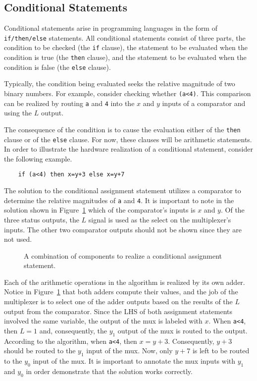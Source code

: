 \subsection{Conditional Statements}
Conditional statements arise in programming languages in the
form of \verb+if/then/else+ statements.  All conditional statements consist
of three parts, the condition to be checked (the \verb+if+ clause), the
statement to be evaluated when the condition is true (the \verb+then+ clause),
and the statement to be evaluated when the condition is false (the
\verb+else+ clause).

Typically, the condition being evaluated seeks the relative
magnitude of two binary numbers.  For example, consider checking whether
\verb+(a<4)+.  This comparison can be
realized by routing \verb+a+ and \verb+4+ into the $x$ and
$y$ inputs of a comparator and using the $L$ output.

The consequence of the condition is to cause the evaluation either of
the \verb+then+ clause or of the \verb+else+ clause.  For now, these
clauses will
be arithmetic statements.  In order to illustrate the hardware
realization of a conditional statement, consider the following
example.

\begin{verbatim}
    if (a<4) then x=y+3 else x=y+7
\end{verbatim}

The solution to the conditional assignment statement utilizes
a comparator to determine the relative magnitudes of \verb+a+
and \verb+4+.  It is important to note in the solution shown in
Figure~\ref{fig:comboBBcond} which of the
comparator's inputs is $x$ and $y$.  Of the three status outputs,
the $L$ signal is used as the select on the multiplexer's inputs.  The
other two comparator outputs should not be shown since they are
not used.

\begin{figure}[ht]
    \caption{A combination of components to realize a conditional assignment
    statement.}
    \label{fig:comboBBcond}
\end{figure}

Each of the arithmetic operations in the algorithm is realized
by its own adder. Notice in Figure~\ref{fig:comboBBcond} that both
adders compute their values, and the job of the multiplexer is to
select one of the adder outputs based on the results of the $L$ output
from the comparator.    Since the LHS of both assignment statements
involved the same variable, the output of the mux is labeled with
$x$.  When \verb+a<4+, then
$L=1$ and, consequently, the $y_1$ output of the mux is routed to the
output.  According to the algorithm, when \verb+a<4+, then $x=y+3$.
Consequently, $y+3$ should be routed to the $y_1$ input of the mux.
Now, only $y+7$ is left to be routed to the $y_0$ input of the mux.  It is
important to annotate the mux inputs with $y_1$ and $y_0$ in order
demonstrate that the solution works correctly.

